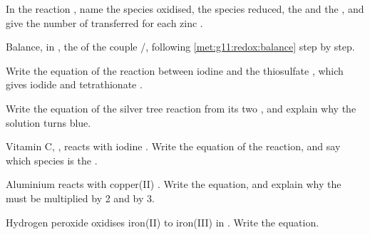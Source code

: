 \begin{exercise}[$\star$]\label{exo:g11:redox:5}
In the reaction , name the species
oxidised, the species reduced, the  and the , and give
the number of  transferred for each zinc .
\end{exercise}

\begin{exercise}[$\star\star$]\label{exo:g11:redox:6}
Balance, in , the  of the couple
/, following \cref{met:g11:redox:balance} step by
step.
\end{exercise}

\begin{exercise}[$\star\star$]\label{exo:g11:redox:7}
Write the equation of the reaction between iodine  and the
thiosulfate  , which gives iodide  and
tetrathionate  .
\end{exercise}

\begin{exercise}[$\star\star$]\label{exo:g11:redox:8}
Write the equation of the silver tree reaction from its two
, and explain why the solution turns blue.
\end{exercise}

\begin{exercise}[$\star\star$]\label{exo:g11:redox:9}
Vitamin C, , reacts with iodine . Write the equation
of the reaction, and say which species is the .
\end{exercise}

\begin{exercise}[$\star\star$]\label{exo:g11:redox:10}
Aluminium reacts with copper(II) . Write the equation, and explain
why the  must be multiplied by 2 and by 3.
\end{exercise}

\begin{exercise}[$\star\star$]\label{exo:g11:redox:11}
Hydrogen peroxide oxidises iron(II)  to iron(III)  in . Write the equation.
\end{exercise}

